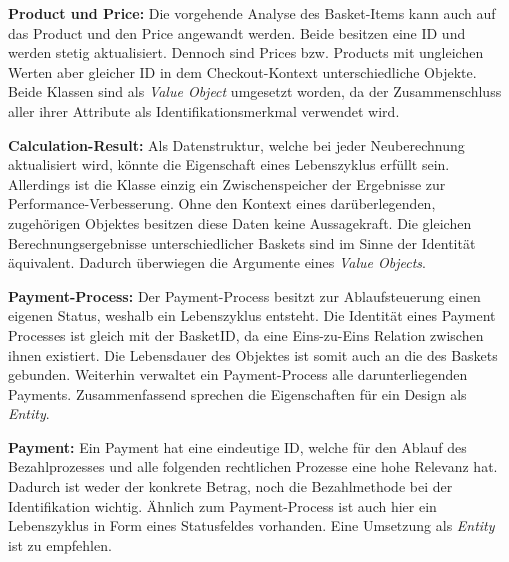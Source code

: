 {	\item \textbf{Product und Price: } {Die vorgehende Analyse des Basket-Items kann auch auf das Product und den Price angewandt werden. Beide besitzen eine ID und werden stetig aktualisiert. Dennoch sind Prices bzw. Products mit ungleichen Werten aber gleicher ID in dem Checkout-Kontext unterschiedliche Objekte. Beide Klassen sind als \emph{Value Object} umgesetzt worden, da der Zusammenschluss aller ihrer Attribute als Identifikationsmerkmal verwendet wird. }
	\item \textbf{Calculation-Result: } {Als Datenstruktur, welche bei jeder Neuberechnung aktualisiert wird, könnte die Eigenschaft eines Lebenszyklus erfüllt sein. Allerdings ist die Klasse einzig ein Zwischenspeicher der Ergebnisse zur Performance-Verbesserung. Ohne den Kontext eines darüberlegenden, zugehörigen Objektes besitzen diese Daten keine Aussagekraft. Die gleichen Berechnungsergebnisse unterschiedlicher Baskets sind im Sinne der Identität äquivalent. Dadurch überwiegen die Argumente eines \emph{Value Objects}.}
	\item \textbf{Payment-Process: } {Der Payment-Process besitzt zur Ablaufsteuerung einen eigenen Status, weshalb ein Lebenszyklus entsteht. Die Identität eines Payment Processes ist gleich mit der BasketID, da eine Eins-zu-Eins Relation zwischen ihnen existiert. Die Lebensdauer des Objektes ist somit auch an die des Baskets gebunden. Weiterhin verwaltet ein Payment-Process alle darunterliegenden Payments. Zusammenfassend sprechen die Eigenschaften für ein Design als \emph{Entity}.}
	\item \textbf{Payment: } {Ein Payment hat eine eindeutige ID, welche für den Ablauf des Bezahlprozesses und alle folgenden rechtlichen Prozesse eine hohe Relevanz hat. Dadurch ist weder der konkrete Betrag, noch die Bezahlmethode bei der Identifikation wichtig. Ähnlich zum Payment-Process ist auch hier ein Lebenszyklus in Form eines Statusfeldes vorhanden. Eine Umsetzung als \emph{Entity} ist zu empfehlen.}
}



